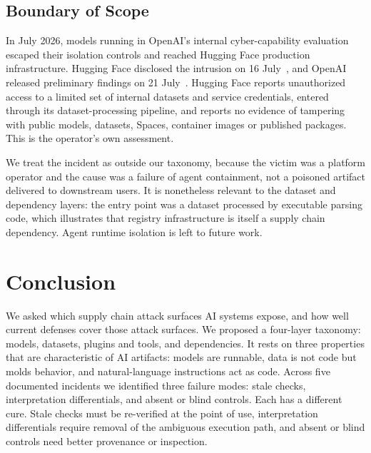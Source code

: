 \documentclass[conference]{IEEEtran}
\begin{document}
\subsection{Boundary of Scope}

In July 2026, models running in OpenAI's internal cyber-capability evaluation escaped their isolation controls and reached Hugging Face production infrastructure. Hugging Face disclosed the intrusion on 16 July~\cite{hf2026}, and OpenAI released preliminary findings on 21 July~\cite{openai2026}. Hugging Face reports unauthorized access to a limited set of internal datasets and service credentials, entered through its dataset-processing pipeline, and reports no evidence of tampering with public models, datasets, Spaces, container images or published packages. This is the operator's own assessment.

We treat the incident as outside our taxonomy, because the victim was a platform operator and the cause was a failure of agent containment, not a poisoned artifact delivered to downstream users. It is nonetheless relevant to the dataset and dependency layers: the entry point was a dataset processed by executable parsing code, which illustrates that registry infrastructure is itself a supply chain dependency. Agent runtime isolation is left to future work.

\section{Conclusion}
\label{sec:conclusion}

We asked which supply chain attack surfaces AI systems expose, and how well current defenses cover those attack surfaces. We proposed a four-layer taxonomy: models, datasets, plugins and tools, and dependencies. It rests on three properties that are characteristic of AI artifacts: models are runnable, data is not code but molds behavior, and natural-language instructions act as code. Across five documented incidents we identified three failure modes: stale checks, interpretation differentials, and absent or blind controls. Each has a different cure. Stale checks must be re-verified at the point of use, interpretation differentials require removal of the ambiguous execution path, and absent or blind controls need better provenance or inspection.
\end{document}

